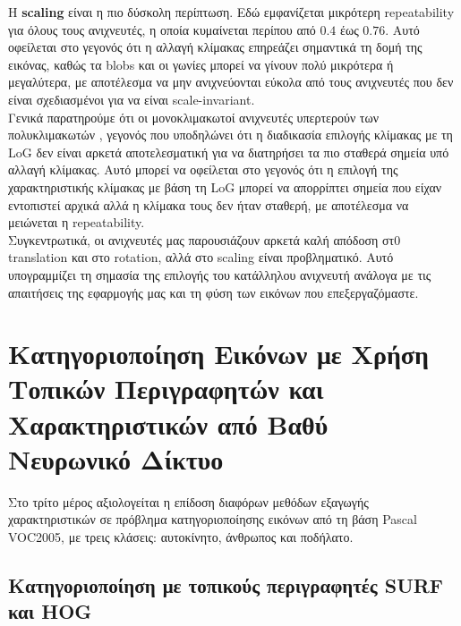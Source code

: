 \documentclass[12pt, a4paper]{article}
\begin{document}
Η \textbf{scaling} είναι η πιο δύσκολη περίπτωση. Εδώ εμφανίζεται μικρότερη
repeatability για όλους τους ανιχνευτές, η οποία κυμαίνεται περίπου από $0.4$ έως $0.76$. Αυτό οφείλεται στο γεγονός ότι η αλλαγή κλίμακας επηρεάζει σημαντικά τη δομή της εικόνας, καθώς τα blobs και οι γωνίες μπορεί να γίνουν πολύ μικρότερα ή μεγαλύτερα, με αποτέλεσμα να μην ανιχνεύονται εύκολα από τους ανιχνευτές που δεν είναι σχεδιασμένοι για να είναι scale-invariant.\\
Γενικά παρατηρούμε ότι οι μονοκλιμακωτοί ανιχνευτές υπερτερούν των πολυκλιμακωτών , γεγονός που υποδηλώνει ότι η διαδικασία επιλογής κλίμακας με τη LoG δεν είναι αρκετά αποτελεσματική για να διατηρήσει τα πιο σταθερά σημεία υπό αλλαγή κλίμακας. Αυτό μπορεί να οφείλεται στο γεγονός ότι η επιλογή της χαρακτηριστικής κλίμακας με βάση τη LoG μπορεί να απορρίπτει σημεία που είχαν εντοπιστεί αρχικά αλλά η κλίμακα τους δεν ήταν σταθερή, με αποτέλεσμα να μειώνεται η repeatability.\\
Συγκεντρωτικά, οι ανιχνευτές μας παρουσιάζουν αρκετά καλή απόδοση στ0 translation και στο rotation, αλλά στο scaling είναι προβληματικό. Αυτό υπογραμμίζει τη σημασία της επιλογής του κατάλληλου ανιχνευτή ανάλογα με τις απαιτήσεις της εφαρμογής μας και τη φύση των εικόνων που επεξεργαζόμαστε.



\clearpage
\section{Κατηγοριοποίηση Εικόνων με Χρήση Τοπικών Περιγραφητών και Χαρακτηριστικών από Βαθύ Νευρωνικό Δίκτυο}

Στο τρίτο μέρος αξιολογείται η επίδοση διαφόρων μεθόδων εξαγωγής χαρακτηριστικών
σε πρόβλημα κατηγοριοποίησης εικόνων από τη βάση Pascal VOC2005, με τρεις κλάσεις:
αυτοκίνητο, άνθρωπος και ποδήλατο.

\subsection{Κατηγοριοποίηση με τοπικούς περιγραφητές SURF και HOG}
\end{document}
